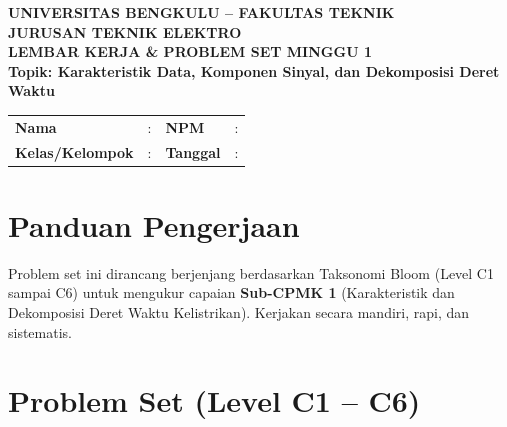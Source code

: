 \documentclass[11pt,a4paper]{article}
\begin{document}
\begin{center}
    {\large \textbf{\color{primaryblue}UNIVERSITAS BENGKULU -- FAKULTAS TEKNIK}}\\[0.1cm]
    {\large \textbf{\color{secondaryblue}JURUSAN TEKNIK ELEKTRO}}\\[0.25cm]
    {\LARGE \textbf{\color{primaryblue}LEMBAR KERJA \& PROBLEM SET MINGGU 1}}\\[0.1cm]
    {\normalsize \textbf{Topik: Karakteristik Data, Komponen Sinyal, dan Dekomposisi Deret Waktu}}
\end{center}

\vspace{0.2cm}

\begin{tcolorbox}[colback=boxbg,colframe=primaryblue,arc=2mm,title=\textbf{Identitas Mahasiswa}]
\small
\begin{tabular}{p{2.5cm}p{5.5cm}p{2.5cm}p{4.5cm}}
\textbf{Nama} & : \dotfill & \textbf{NPM} & : \dotfill \\
\textbf{Kelas/Kelompok} & : \dotfill & \textbf{Tanggal} & : \dotfill \\
\end{tabular}
\end{tcolorbox}

\vspace{0.2cm}

\section{Panduan Pengerjaan}
Problem set ini dirancang berjenjang berdasarkan Taksonomi Bloom (Level C1 sampai C6) untuk mengukur capaian \textbf{Sub-CPMK 1} (Karakteristik dan Dekomposisi Deret Waktu Kelistrikan). Kerjakan secara mandiri, rapi, dan sistematis.

\section{Problem Set (Level C1 -- C6)}
\end{document}
